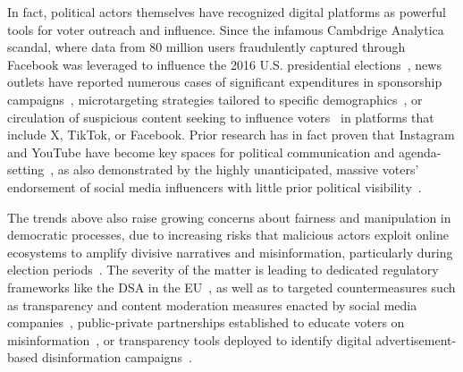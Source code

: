 \documentclass[9pt,sigconf,letterpaper]{acmart}
\begin{document}
In fact, political actors themselves have recognized digital platforms as powerful tools for voter outreach and influence.
Since the infamous Cambdrige Analytica scandal, where data from 80 million users fraudulently captured through Facebook was leveraged to influence the 2016 U.S. presidential elections~\cite{guardianCambridgeAnalytica}, news outlets have reported numerous cases of significant expenditures in sponsorship campaigns~\cite{le_monde_facebook_RN}, microtargeting strategies tailored to specific demographics~\cite{le_monde_facebook_LREM}, or circulation of suspicious content seeking to influence voters~\cite{el_pais_election} in platforms that include X, TikTok, or Facebook.
Prior research has in fact proven that Instagram and YouTube have become key spaces for political communication and agenda-setting~\cite {instagram_political, robert2024video, shevtsov2023tweets, neihouser2025bringing},
as also demonstrated by the highly unanticipated, massive voters' endorsement of social media influencers with little prior political visibility~\cite{politico_salf,bbc_panayiotou}.

The trends above also raise growing concerns about fairness and manipulation in democratic processes, due to increasing risks that malicious actors exploit online ecosystems to amplify divisive narratives and misinformation, particularly during election periods~\cite{luceri2024leveraging, Castiglioni_Ferraioli_Gatti_2020, de2013polarization, cao2014uncovering}.
%
The severity of the matter is leading to dedicated regulatory frameworks like the \ac{DSA} in the \ac{EU}~\cite{Lella2023}, as well as to targeted countermeasures such as transparency and content moderation measures enacted by social media companies~\cite{lemondeFaussesInformations}, public-private partnerships established to educate voters on misinformation~\cite{fbElectionsFranaises}, or transparency tools deployed to identify digital advertisement-based disinformation campaigns~\cite{cano2021disinformation, pierri2023political, bene2021political, beraldo2021political}.
\end{document}
